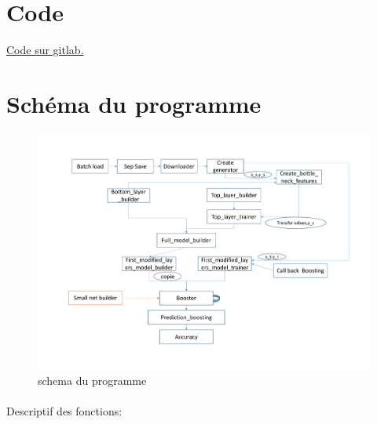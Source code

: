 \documentclass[11 pt]{article}
\begin{document}
\bigskip
\nocite{*}



\pagebreak
\begin{appendices}
  \section{Code}
    \href{https://gitlab.com/zlanderous/transboost}{Code sur gitlab.}

  \section{Schéma du programme}
  \begin{figure}[h]
    \includegraphics[width=\textwidth]{figTot.pdf}
    \caption{schema du programme}
    \label{figTot}
  \end{figure}
  \paragraph{}Descriptif des fonctions:\\


\end{appendices}
\end{document}
